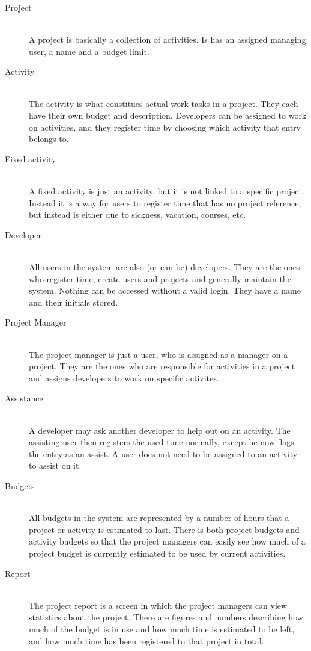 \begin{description}
\item[Project] \hfill \\
A project is basically a collection of activities. Is has an assigned managing user, a name and a budget limit.  

\item[Activity] \hfill \\
The activity is what constitues actual work tasks in a project. They each have their own budget and description. Developers can be assigned to work on activities, and they register time by choosing which activity that entry belongs to.

\item[Fixed activity] \hfill \\
A fixed activity is just an activity, but it is not linked to a specific project. Instead it is a way for users to register time that has no project reference, but instead is either due to sickness, vacation, courses, etc.

\item[Developer] \hfill \\
All users in the system are also (or can be) developers. They are the ones who register time, create users and projects and generally maintain the system. Nothing can be accessed without a valid login. They have a name and their initials stored.

\item[Project Manager] \hfill \\
The project manager is just a user, who is assigned as a manager on a project. They are the ones who are responsible for activities in a project and assigns developers to work on specific activites.

\item[Assistance] \hfill \\
A developer may ask another developer to help out on an activity. The assisting user then registers the used time normally, except he now flags the entry as an assist. A user does not need to be assigned to an activity to assist on it.

\item[Budgets] \hfill \\
All budgets in the system are represented by a number of hours that a project or activity is estimated to last. There is both project budgets and activity budgets so that the project managers can easily see how much of a project budget is currently estimated to be used by current activities.

\item[Report] \hfill \\
The project report is a screen in which the project managers can view statistics about the project. There are figures and numbers describing how much of the budget is in use and how much time is estimated to be left, and how much time has been registered to that project in total.

\end{description}